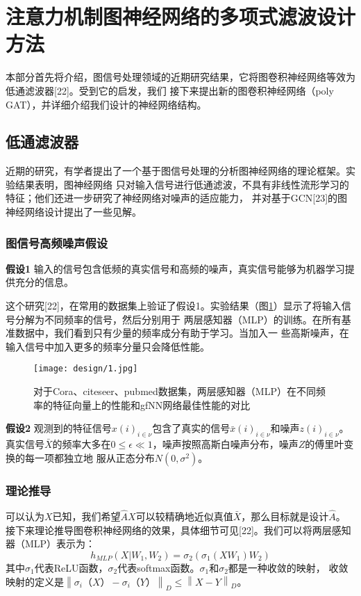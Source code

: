 \cleardoublepage

\section{注意力机制图神经网络的多项式滤波设计方法}
本部分首先将介绍，图信号处理领域的近期研究结果，它将图卷积神经网络等效为低通滤波器[22]。受到它的启发，我们
接下来提出新的图卷积神经网络（poly GAT），并详细介绍我们设计的神经网络结构。

\subsection{低通滤波器}
近期的研究，有学者提出了一个基于图信号处理的分析图神经网络的理论框架。实验结果表明，图神经网络
只对输入信号进行低通滤波，不具有非线性流形学习的特征；他们还进一步研究了神经网络对噪声的适应能力，
并对基于GCN[23]的图神经网络设计提出了一些见解。
\subsubsection{图信号高频噪声假设}
    \textbf{假设1} \quad 输入的信号包含低频的真实信号和高频的噪声，真实信号能够为机器学习提供充分的信息。
    
    这个研究[22]，在常用的数据集上验证了假设1。实验结果（图\ref{3-1}）显示了将输入信号分解为不同频率的信号，然后分别用于
    两层感知器（MLP）的训练。在所有基准数据中，我们看到只有少量的频率成分有助于学习。当加入一
    些高斯噪声，在输入信号中加入更多的频率分量只会降低性能。
    \begin{figure}[ht]
        \centering
        \captionsetup{width=10cm}
        \texttt{[image: design/1.jpg]}
        \caption{\label{3-1}对于Cora、citeseer、pubmed数据集，两层感知器（MLP）在不同频率的特征向量上的性能和gfNN网络最佳性能的对比}
    \end{figure}
    
    \textbf{假设2} \quad 
    观测到的特征信号${x(i)}_{i \in \nu}$包含了真实的信号${\bar{x}(i)}_{i \in \nu}$和噪声${z(i)}_{i \in \nu}$。
    真实信号$\bar{X}$的频率大多在$ 0 \le \epsilon \ll 1 $，噪声按照高斯白噪声分布，噪声$Z$的傅里叶变换的每一项都独立地
    服从正态分布$ N(0,\sigma^{2} ) $。

\subsubsection{理论推导}
可以认为$ X $已知，我们希望$ \hat{A}X $可以较精确地近似真值$ \bar{X} $，那么目标就是设计$ \hat{A} $。
接下来理论推导图卷积神经网络的效果，具体细节可见[22]。我们可以将两层感知器（MLP）表示为：
$$ h_{MLP}(X|W_1,W_2) = \sigma_{2}(\sigma_{1}(XW_1)W_2) $$
其中$\sigma_{1}$代表ReLU函数，$\sigma_{2}$代表softmax函数。$\sigma_{1}$和$\sigma_{2}$都是一种收敛的映射，
收敛映射的定义是$  \left \| \sigma_{i}（X）- \sigma_{i}（Y） \right \|_{D}  \le  \left \| X-Y \right \|_{D} $。

